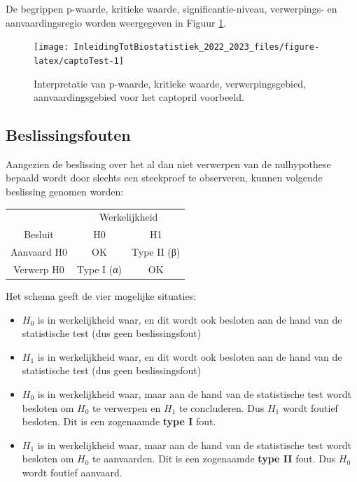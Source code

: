 \documentclass[
  12pt,dutch,coursenotes]{book}
\begin{document}
De begrippen p-waarde, kritieke waarde, significantie-niveau, verwerpings- en aanvaardingsregio worden weergegeven in Figuur \ref{fig:captoTest}.

\begin{figure}

{\centering \texttt{[image: InleidingTotBiostatistiek\_2022\_2023\_files/figure-latex/captoTest-1]} 

}

\caption{Interpretatie van p-waarde, kritieke waarde, verwerpingsgebied, aanvaardingsgebied voor het captopril voorbeeld.}\label{fig:captoTest}
\end{figure}

\hypertarget{beslissingsfouten}{%
\subsection{Beslissingsfouten}\label{beslissingsfouten}}

Aangezien de beslissing over het al dan niet verwerpen van de nulhypothese bepaald wordt door slechts een steekproef te observeren, kunnen volgende beslissing genomen worden:

\begin{table}
\centering
\begin{tabular}{c|c|c}
\hline
\multicolumn{1}{c|}{ } & \multicolumn{2}{c}{Werkelijkheid} \\
\cline{2-3}
Besluit & H0 & H1\\
\hline
Aanvaard H0 & OK & Type II (β)\\
\hline
Verwerp H0 & Type I (α) & OK\\
\hline
\end{tabular}
\end{table}

Het schema geeft de vier mogelijke situaties:

\begin{itemize}
\item
  \(H_0\) is in werkelijkheid waar, en dit wordt ook besloten aan de hand van de statistische test (dus geen beslissingsfout)
\item
  \(H_1\) is in werkelijkheid waar, en dit wordt ook besloten aan de hand van de statistische test (dus geen beslissingsfout)
\item
  \(H_0\) is in werkelijkheid waar, maar aan de hand van de statistische test wordt besloten om \(H_0\) te verwerpen en \(H_1\) te concluderen. Dus \(H_1\) wordt foutief besloten. Dit is een zogenaamde \textbf{type I} fout.
\item
  \(H_1\) is in werkelijkheid waar, maar aan de hand van de statistische test wordt besloten om \(H_0\) te aanvaarden.
  Dit is een zogenaamde \textbf{type II} fout. Dus \(H_0\) wordt foutief aanvaard.
\end{itemize}
\end{document}
